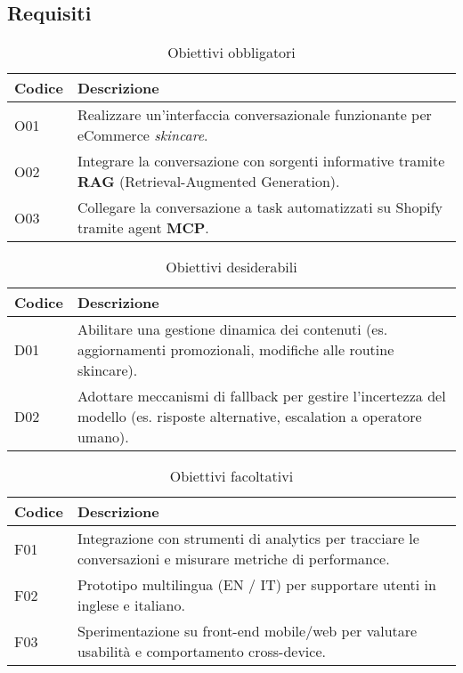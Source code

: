 \subsection{Requisiti}

\begin{table}[H]
    \centering
    \caption{Obiettivi obbligatori}
    \begin{tabularx}{\textwidth}{@{}l X@{}}
      \toprule
      \textbf{Codice} & \textbf{Descrizione} \\
      \midrule
      O01 & Realizzare un'interfaccia conversazionale funzionante per eCommerce \textit{skincare}. \\
      O02 & Integrare la conversazione con sorgenti informative tramite \textbf{RAG} (Retrieval-Augmented Generation). \\
      O03 & Collegare la conversazione a task automatizzati su Shopify tramite agent \textbf{MCP}. \\
      \bottomrule
    \end{tabularx}
  \end{table}
  
  \vspace{8pt}
  
  \begin{table}[H]
    \centering
    \caption{Obiettivi desiderabili}
    \begin{tabularx}{\textwidth}{@{}l X@{}}
      \toprule
      \textbf{Codice} & \textbf{Descrizione} \\
      \midrule
      D01 & Abilitare una gestione dinamica dei contenuti (es. aggiornamenti promozionali, modifiche alle routine skincare). \\
      D02 & Adottare meccanismi di fallback per gestire l'incertezza del modello (es. risposte alternative, escalation a operatore umano). \\
      \bottomrule
    \end{tabularx}
  \end{table}
  
  \vspace{8pt}
  
  \begin{table}[H]
    \centering
    \caption{Obiettivi facoltativi}
    \begin{tabularx}{\textwidth}{@{}l X@{}}
      \toprule
      \textbf{Codice} & \textbf{Descrizione} \\
      \midrule
      F01 & Integrazione con strumenti di analytics per tracciare le conversazioni e misurare metriche di performance. \\
      F02 & Prototipo multilingua (EN / IT) per supportare utenti in inglese e italiano. \\
      F03 & Sperimentazione su front-end mobile/web per valutare usabilità e comportamento cross-device. \\
      \bottomrule
    \end{tabularx}
  \end{table}

